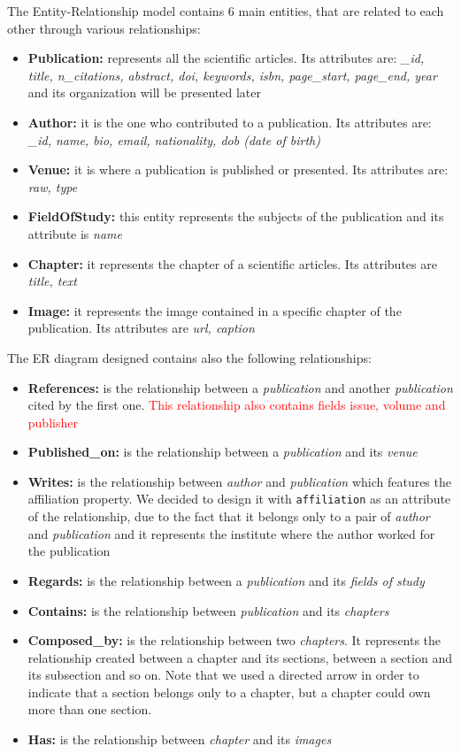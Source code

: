 \documentclass{Configuration_Files/PoliMi3i_thesis}
\begin{document}
\bigskip
The Entity-Relationship model contains 6 main entities, that are related to each other through various relationships:
\begin{itemize}
	\item \textbf{Publication:} represents all the scientific articles. Its attributes are: \emph{\_id, title, n\_citations,
		abstract, doi, keywords, isbn, page\_start, page\_end, year} and its organization will be presented later
	\item \textbf{Author:} it is the one who contributed to a publication. Its attributes are: \emph{\_id, name, bio,
		email, nationality, dob (date of birth)}
	\item \textbf{Venue:} it is where a publication is published or presented. Its attributes are: \emph{raw, type}
	\item \textbf{FieldOfStudy:} this entity represents the subjects of the publication and its attribute is \emph{name}
	\item \textbf{Chapter:} it represents the chapter of a scientific articles. Its attributes are \emph{title, text}
	\item \textbf{Image:} it represents the image contained in a specific chapter of the publication. Its attributes are
		\emph{url, caption}
\end{itemize}

The ER diagram designed contains also the following relationships:
\begin{itemize}
	\item \textbf{References:} is the relationship between a \emph{publication} and another \emph{publication} cited by the first one.
		\textcolor{red}{This relationship also contains fields issue, volume and publisher}
	\item \textbf{Published\_on:} is the relationship between a \emph{publication} and its \emph{venue}
	\item \textbf{Writes:} is the relationship between \emph{author} and \emph{publication} which features the affiliation property.
		We decided to design it with \verb |affiliation| as an attribute of the relationship, due to the fact that it belongs
		only to a pair of \emph{author} and \emph{publication} and it represents the institute where the author worked for the publication
	\item \textbf{Regards:} is the relationship between a \emph{publication} and its \emph{fields of study}
	\item \textbf{Contains:} is the relationship between \emph{publication} and its \emph{chapters} 
	\item \textbf{Composed\_by:} is the relationship between two \emph{chapters}. It represents the relationship created
		between a chapter and its sections, between a section and its subsection and so on. Note that we used a directed
		arrow in order to indicate that a section belongs only to a chapter, but a chapter could own more than one section.
	\item \textbf{Has:} is the relationship between \emph{chapter} and its \emph{images}
\end{itemize}
\end{document}
